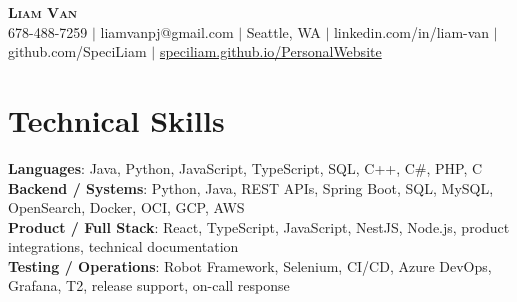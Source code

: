 \documentclass[letterpaper,11pt]{article}
\begin{document}

%
\begin{center}
    \textbf{\Huge \scshape Liam Van} \\ \vspace{1pt}
    \small 678-488-7259 $|$ \small {liamvanpj@gmail.com} $|$ Seattle, WA
 {{$|$ linkedin.com/in/liam-van} {$|$ github.com/SpeciLiam} {$|$ \href{https://speciliam.github.io/PersonalWebsite}{speciliam.github.io/PersonalWebsite}}}

\end{center}

\section{Technical Skills}
 \begin{itemize}[leftmargin=0.15in, label={}]
    \small{\item{
     \textbf{Languages}{: Java, Python, JavaScript, TypeScript, SQL, C++, C\#, PHP, C} \\
     \textbf{Backend / Systems}{: Python, Java, REST APIs, Spring Boot, SQL, MySQL, OpenSearch, Docker, OCI, GCP, AWS} \\
     \textbf{Product / Full Stack}{: React, TypeScript, JavaScript, NestJS, Node.js, product integrations, technical documentation} \\
     \textbf{Testing / Operations}{: Robot Framework, Selenium, CI/CD, Azure DevOps, Grafana, T2, release support, on-call response} \\
    }}
 \end{itemize}
%
\end{document}
